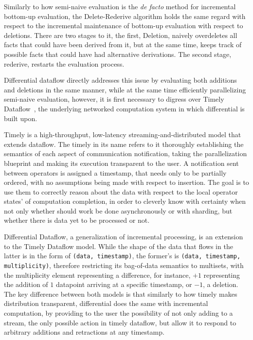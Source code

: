 \documentclass[sigconf,screen,review,natbib]{acmart}
\theoremstyle{definition}
\begin{document}
Similarly to how semi-naive evaluation is the \textit{de facto} method for incremental bottom-up
evaluation, the Delete-Rederive\cite{dred} algorithm holds the same regard with respect to
the incremental maintenance of bottom-up evaluation with respect to deletions. There are two stages
to it, the first, Deletion, naively overdeletes all facts that could have been derived from it, but
at the same time, keeps track of possible facts that could have had alternative derivations. The second
stage, rederive, restarts the evaluation process.

Differential dataflow directly addresses this issue by evaluating both additions and deletions in the
same manner, while at the same time efficiently parallelizing semi-naive evaluation, however, it is first
necessary to digress over Timely Dataflow~\cite{timely}, the underlying networked computation system
in which differential is built upon.

Timely is a high-throughput, low-latency streaming-and-distributed model that extends dataflow. The
timely in its name refers to it thoroughly establishing the semantics of each aspect of communication
notification, taking the parallelization blueprint and making its execution transparent to the
user. A notification sent between operators is assigned a timestamp, that needs only to be partially
ordered, with no assumptions being made with respect to insertion. The goal is to use them to correctly
reason about the data with respect to the local operator states' of computation completion, in order to
cleverly know with certainty when not only whether should work be done asynchronously or with sharding, but
whether there is data yet to be processed or not.

Differential Dataflow, a generalization of incremental processing, is an extension to the Timely
Dataflow model. While the shape of the data that flows in the latter is in the form of \verb|(data, timestamp)|, the
former's is \verb|(data, timestamp, multiplicity)|, therefore restricting its bag-of-data semantics to multisets, with
the multiplicity element representing a difference, for instance, $+1$ representing the addition of $1$ datapoint
arriving at a specific timestamp, or $-1$, a deletion. The key difference between both models is that similarly to how
timely makes distribution transparent, differential does the same with incremental computation, by providing to the
user the possibility of not only adding to a stream, the only possible action in timely dataflow, but allow it to
respond to arbitrary additions and retractions at any timestamp.
\end{document}
